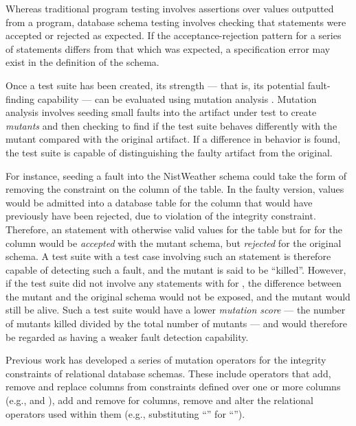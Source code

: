 Whereas traditional program testing involves assertions over values outputted from a program, database schema testing involves checking that \INSERT statements were accepted or rejected as expected. If the acceptance-rejection pattern for a series of \INSERT statements differs from that which was expected, a specification error may exist in the definition of the schema.

Once a test suite has been created, its strength --- that is, its potential fault-finding capability --- can be evaluated using mutation analysis \cite{Jia2011}. Mutation analysis involves seeding small faults into the artifact under test to create {\it mutants} and then checking to find if the test suite behaves differently with the mutant compared with the original artifact. If a difference in behavior is found, the test suite is capable of distinguishing the faulty artifact from the original.

For instance, seeding a fault into the NistWeather schema could take the form of removing the \NOTNULL constraint on the  column of the  table. In the faulty version, \NULL values would be admitted into a database table for the  column that would have previously have been rejected, due to violation of the integrity constraint. Therefore, an \INSERT statement with otherwise valid values for the  table but for \NULL for the  column would be {\it accepted} with the mutant schema, but {\it rejected} for the original schema. A test suite with a test case involving such an \INSERT statement is therefore capable of detecting such a fault, and the mutant is said to be ``killed''. However, if the test suite did not involve any \INSERT statements with \NULL for , the difference between the mutant and the original schema would not be exposed, and the mutant would still be alive. Such a test suite would have a lower {\it mutation score} --- the number of mutants killed divided by the total number of mutants --- and would therefore be regarded as having a weaker fault detection capability.

Previous work \cite{Kapfhammer2013,Wright2013,Wright2014} has developed a series of mutation operators for the integrity constraints of relational database schemas. These include operators that add, remove and replace columns from constraints defined over one or more columns (e.g., \PK and \FKCs), add and remove \NNCs for columns, remove \CCs and alter the relational operators used within them (e.g., substituting ``\sql{>}'' for ``\sql{>=}'').

